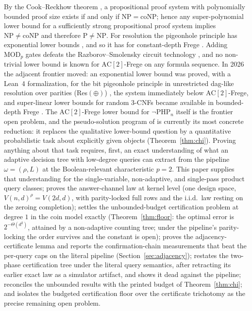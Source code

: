 \documentclass[11pt]{article}
\theoremstyle{definition}
\theoremstyle{remark}
\newcommand{\PHPn}{\neg\mathrm{PHP}_n}
\newcommand{\AC}{\mathrm{AC}}
\begin{document}
By the Cook--Reckhow theorem \cite{CookReckhow79}, a propositional proof
system with polynomially bounded proof size exists if and only if
$\mathrm{NP}=\mathrm{coNP}$; hence any super-polynomial lower bound for a
sufficiently strong propositional proof system implies
$\mathrm{NP}\neq\mathrm{coNP}$ and therefore $\mathrm{P}\neq\mathrm{NP}$.
For resolution the pigeonhole principle has exponential lower bounds
\cite{Haken85}, and so it has for constant-depth Frege \cite{Ajtai94}.
Adding $\mathrm{MOD}_p$ gates defeats the Razborov--Smolensky circuit
technology \cite{Smolensky87}, and no non-trivial lower bound is known for
$\AC[2]$-Frege on any formula sequence.  In 2026 the adjacent frontier
moved: an exponential lower bound was proved, with a Lean~4 formalization,
for the bit pigeonhole principle in unrestricted dag-like resolution over
parities (Res$(\oplus)$) \cite{resxor26}, the system immediately below
$\AC[2]$-Frege, and super-linear lower bounds for random 3-CNFs became
available in bounded-depth Frege \cite{randomcnf26}.  The $\AC[2]$-Frege
lower bound for $\PHPn$ itself is the frontier open problem, and the
pseudo-solution program of \cite{Kra26} is currently its most concrete
reduction: it replaces the qualitative lower-bound question by a
quantitative probabilistic task about explicitly given objects
(Theorem~\ref{thm:chi}).  Proving anything about that task requires, first,
an exact understanding of what an adaptive decision tree with low-degree
queries can extract from the pipeline $\omega=(\rho,L)$ at the
Boolean-relevant characteristic $p=2$.  This paper supplies that
understanding for the single-variable, non-adaptive, and single-pass
product query classes; proves the answer-channel law at kernel level
(one design space, $V(n,d)^{\rho}=V(2d,d)$, with parity-locked full
rows and the i.i.d.\ law resting on the zeroing completion);
settles the unbounded-budget certification
problem at degree $1$ in the coin model exactly (Theorem~\ref{thm:floor}:
the optimal error is $2^{-\Theta(d^2)}$, attained by a non-adaptive
counting tree; under the pipeline's parity-locking the order survives
and the constant is open); proves the adjacency-certificate lemma and
reports the confirmation-chain measurements that beat the per-query
caps on the literal pipeline (Section~\ref{sec:adjacency});
restates the two-phase certification tree under the literal query
semantics, after retracting its earlier exact law as a simulator
artifact, and shows it dead against the pipeline;
reconciles the unbounded results with the printed budget of
Theorem~\ref{thm:chi}; and isolates the budgeted certification floor
over the certificate trichotomy as
the precise remaining open problem.
\end{document}
